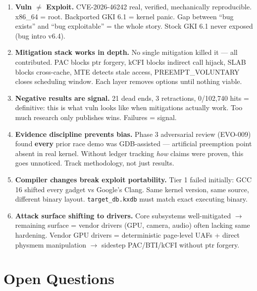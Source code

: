 \documentclass[11pt,a4paper]{article}
\begin{document}
\begin{enumerate}
  \item \textbf{Vuln $\neq$ Exploit.} CVE-2026-46242 real, verified, mechanically reproducible. x86\_64 = root. Backported GKI 6.1 = kernel panic. Gap between \enquote{bug exists} and \enquote{bug exploitable} = the whole story. Stock GKI 6.1 never exposed (bug intro v6.4).

  \item \textbf{Mitigation stack works in depth.} No single mitigation killed it --- all contributed. PAC blocks ptr forgery, kCFI blocks indirect call hijack, SLAB blocks cross-cache, MTE detects stale access, PREEMPT\_VOLUNTARY closes scheduling window. Each layer removes options until nothing viable.

  \item \textbf{Negative results are signal.} 21 dead ends, 3 retractions, 0/102,740 hits = definitive: this is what vuln looks like when mitigations actually work. Too much research only publishes wins. Failures = signal.

  \item \textbf{Evidence discipline prevents bias.} Phase 3 adversarial review (EVO-009) found \textbf{every} prior race demo was GDB-assisted --- artificial preemption point absent in real kernel. Without ledger tracking \textit{how} claims were proven, this goes unnoticed. Track methodology, not just results.

  \item \textbf{Compiler changes break exploit portability.} Tier 1 failed initially: GCC 16 shifted every gadget vs Google's Clang. Same kernel version, same source, different binary layout. \texttt{target\_db.kxdb} must match exact executing binary.

  \item \textbf{Attack surface shifting to drivers.} Core subsystems well-mitigated $\to$ remaining surface = vendor drivers (GPU, camera, audio) often lacking same hardening. Vendor GPU drivers = deterministic page-level UAFs + direct physmem manipulation $\to$ sidestep PAC/BTI/kCFI without ptr forgery.
\end{enumerate}

\newpage

\section{Open Questions}
\end{document}
